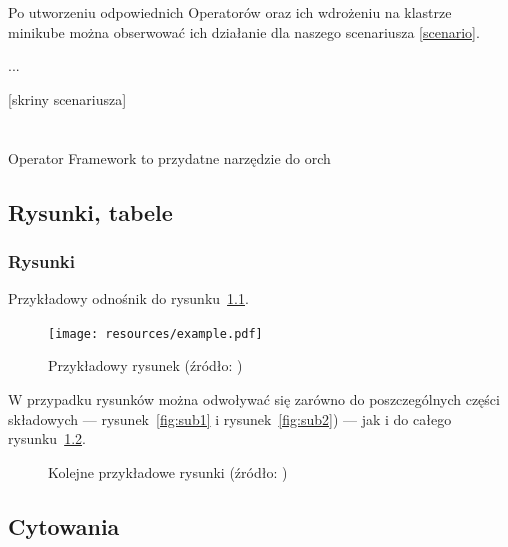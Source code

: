 \documentclass[polish]{aghengthesis}
\begin{document}
Po utworzeniu odpowiednich Operatorów oraz ich wdrożeniu na klastrze minikube można obserwować ich działanie dla naszego scenariusza \ref{scenario}.


...


[skriny scenariusza]
\chapter{\ChapterTitleSummary}
\label{sec:podsumowanie}

Operator Framework to przydatne narzędzie do orch


\section{Rysunki, tabele}
\label{sec:rysunki-tabele}

\subsection{Rysunki}
\label{sec:rysunki}

Przykładowy odnośnik do rysunku~\ref{fig:ex1}.

\begin{figure}[!htbp]
  \centering
\texttt{[image: resources/example.pdf]}
\caption[Przykładowy rysunek]{Przykładowy rysunek (źródło:
  \cite{author2021title})}
\label{fig:ex1}
\end{figure}
 
W przypadku rysunków można odwoływać się zarówno do poszczególnych części
składowych --- rysunek~\ref{fig:sub1} i rysunek~\ref{fig:sub2}) --- jak i do
całego rysunku~\ref{fig:ex2}.

\begin{figure}[!htbp]
\begin{center}
%
\end{center}
\caption[Kolejne przykładowe rysunki]{Kolejne przykładowe rysunki (źródło:
  \cite{author2021title})}
\label{fig:ex2}
\end{figure}


\section{Cytowania}
\label{sec:cytowania}
\end{document}
